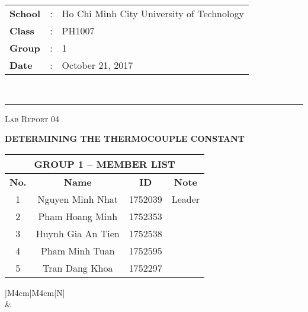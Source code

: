 \documentclass[12pt, a4paper]{article}
\begin{document}
\noindent
\begin{tabular}{lll}
    \textbf{School} & : & Ho Chi Minh City University of Technology \\
    \textbf{Class} & : & PH1007 \\
    \textbf{Group} & : & 1 \\
    \textbf{Date} & : & October 21, 2017 \\
\end{tabular}\\
\rule[2ex]{\textwidth}{2pt}

\vspace{2cm}

\begin{center}
    {\scshape\Large Lab Report 04 \par}
    \vspace{1.5cm}
    {\Huge\bfseries DETERMINING THE THERMOCOUPLE CONSTANT \par}
    \vspace{3cm}

    \begin{tabular}{|c|c|c|c|}
        \hline 
        \multicolumn{4}{|c|}{\textbf{GROUP 1 -- MEMBER LIST}} \\ 
        \hline 
        \textbf{No.} &\qquad\qquad \textbf{Name}\qquad\qquad\qquad & \qquad\textbf{ID}\qquad\qquad & \qquad\textbf{Note}\qquad\qquad \\ 
        \hline 
        1 & Nguyen Minh Nhat  & 1752039 & Leader \\ 
        \hline 
        2 & Pham Hoang Minh   & 1752353 &  \\ 
        \hline 
        3 & Huynh Gia An Tien & 1752538 &  \\ 
        \hline 
        4 & Pham Minh Tuan    & 1752595 &  \\ 
        \hline 
        5 & Tran Dang Khoa    & 1752297 &  \\ 
        \hline 
    \end{tabular} 

    \vspace{3cm}

    \begin{table}[ht]
        \centering
        \begin{tabular}{|M{4cm}|M{4cm}|N|}
            \hline
             \\
            \hline
             &  \\ [50pt]
            \hline
        \end{tabular}
    \end{table}
\end{center}
\end{document}
